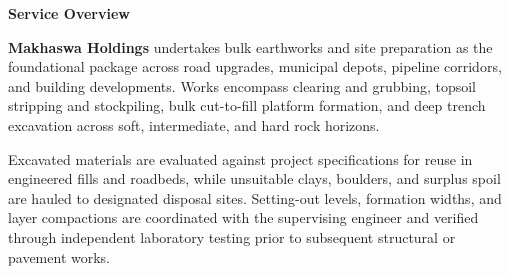 \documentclass[a4paper,11pt]{article}
\begin{document}
\noindent
\begin{minipage}[t]{0.63\textwidth}
    \vspace{0pt}
    {\large\bfseries\color{mhnavy} Service Overview}
    \vspace{0.08cm}

    {\fontsize{8.7pt}{12.3pt}\selectfont\color{mhtext}
    \textbf{Makhaswa Holdings} undertakes bulk earthworks and site preparation as the foundational package across road upgrades, municipal depots, pipeline corridors, and building developments. Works encompass clearing and grubbing, topsoil stripping and stockpiling, bulk cut-to-fill platform formation, and deep trench excavation across soft, intermediate, and hard rock horizons.
    }

    \vspace{0.15cm}

    {\fontsize{8.7pt}{12.3pt}\selectfont\color{mhtext}
    Excavated materials are evaluated against project specifications for reuse in engineered fills and roadbeds, while unsuitable clays, boulders, and surplus spoil are hauled to designated disposal sites. Setting-out levels, formation widths, and layer compactions are coordinated with the supervising engineer and verified through independent laboratory testing prior to subsequent structural or pavement works.
    }
\end{minipage}
\hfill
\end{document}
